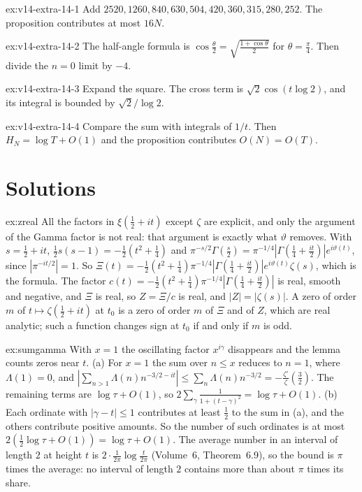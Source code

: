 \begin{hint}{ex:v14-extra-14-1}
Add $2520,1260,840,630,504,420,360,315,280,252$. The proposition contributes at most $16N$.
\end{hint}

\begin{hint}{ex:v14-extra-14-2}
The half-angle formula is $\cos\frac\theta2=\sqrt{\frac{1+\cos\theta}2}$ for $\theta=\frac\pi4$. Then divide the $n=0$ limit by $-4$.
\end{hint}

\begin{hint}{ex:v14-extra-14-3}
Expand the square. The cross term is $\sqrt2\cos(t\log2)$, and its integral is bounded by $\sqrt2/\log2$.
\end{hint}

\begin{hint}{ex:v14-extra-14-4}
Compare the sum with integrals of $1/t$. Then $H_N=\log T+O(1)$ and the proposition contributes $O(N)=O(T)$.
\end{hint}

\section{Solutions}

\begin{solution}{ex:zreal}
\idea All the factors in $\xi(\frac12+it)$ except $\zeta$ are explicit, and only the argument of the Gamma factor is not real: that argument is exactly what $\vartheta$ removes.
\writeup With $s=\frac12+it$, $\frac12s(s-1)=-\frac12(t^2+\frac14)$ and $\pi^{-s/2}\Gamma(\frac s2)=\pi^{-1/4}|\Gamma(\frac14+\frac{it}2)|e^{i\vartheta(t)}$, since $|\pi^{-it/2}|=1$. So $\Xi(t)=-\frac12(t^2+\frac14)\pi^{-1/4}|\Gamma(\frac14+\frac{it}2)|e^{i\vartheta(t)}\zeta(s)$, which is the formula. The factor $c(t)=-\frac12(t^2+\frac14)\pi^{-1/4}|\Gamma(\frac14+\frac{it}2)|$ is real, smooth and negative, and $\Xi$ is real, so $Z=\Xi/c$ is real, and $|Z|=|\zeta(s)|$. A zero of order $m$ of $t\mapsto\zeta(\frac12+it)$ at $t_0$ is a zero of order $m$ of $\Xi$ and of $Z$, which are real analytic; such a function changes sign at $t_0$ if and only if $m$ is odd.
\end{solution}

\begin{solution}{ex:sumgamma}
\idea With $x=1$ the oscillating factor $x^{i\gamma}$ disappears and the lemma counts zeros near $t$.
\writeup (a) For $x=1$ the sum over $n\le x$ reduces to $n=1$, where $\Lambda(1)=0$, and $|\sum_{n>1}\Lambda(n)n^{-3/2-it}|\le\sum_n\Lambda(n)n^{-3/2}=-\frac{\zeta'}\zeta(\frac32)$. The remaining terms are $\log\tau+O(1)$, so $2\sum_\gamma\frac1{1+(t-\gamma)^2}=\log\tau+O(1)$.
(b) Each ordinate with $|\gamma-t|\le1$ contributes at least $\frac12$ to the sum in (a), and the others contribute positive amounts. So the number of such ordinates is at most $2(\frac12\log\tau+O(1))=\log\tau+O(1)$. The average number in an interval of length $2$ at height $t$ is $2\cdot\frac1{2\pi}\log\frac t{2\pi}$ (Volume~6, Theorem~6.9), so the bound is $\pi$ times the average: no interval of length $2$ contains more than about $\pi$ times its share.
\end{solution}

